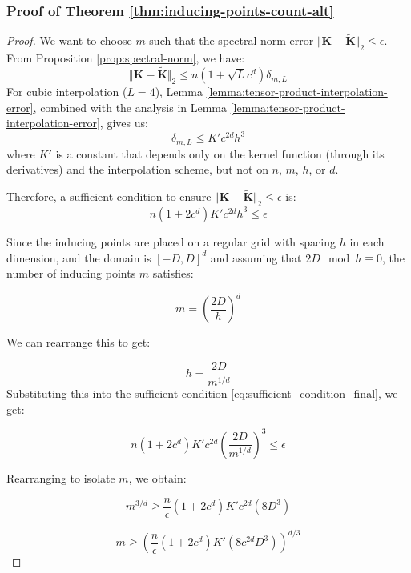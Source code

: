 \subsubsection{Proof of Theorem \ref{thm:inducing-points-count-alt}}\label{sec:proof-inducing-points-count-alt}
\inducingpointscountalt*
\begin{proof}
    We want to choose $m$ such that the spectral norm error $\Vert \textbf{K} - \tilde{\textbf{K}} \Vert_2 \leq \epsilon$. From Proposition \ref{prop:spectral-norm}, we have:
    $$
    \Vert \textbf{K} - \tilde{\textbf{K}} \Vert_2 \leq n(1 + \sqrt{L}c^d) \delta_{m,L}
    $$
    For cubic interpolation ($L=4$), Lemma \ref{lemma:tensor-product-interpolation-error}, combined with the analysis in Lemma \ref{lemma:tensor-product-interpolation-error}, gives us:
    $$
    \delta_{m,L} \leq K' c^{2d} h^3
    $$
    where $K'$ is a constant that depends only on the kernel function (through its derivatives) and the interpolation scheme, but not on $n$, $m$, $h$, or $d$.

    Therefore, a sufficient condition to ensure $\Vert \textbf{K} - \tilde{\textbf{K}} \Vert_2 \leq \epsilon$ is:
    \begin{equation} \label{eq:sufficient_condition_final}
    n(1 + 2c^d) K' c^{2d} h^3 \leq \epsilon
    \end{equation}

    Since the inducing points are placed on a regular grid with spacing $h$ in each dimension, and the domain is $[-D,D]^d$ and assuming that $2D\mod h\equiv 0$, the number of inducing points $m$ satisfies:

    $$
    m = \left(\frac{2D}{h}\right)^d
    $$

    We can rearrange this to get:

    $$
    h = \frac{2D}{m^{1/d}}
    $$
    Substituting this into the sufficient condition \eqref{eq:sufficient_condition_final}, we get:

    $$
    n (1 + 2c^d) K' c^{2d} \left(\frac{2D}{m^{1/d}}\right)^3 \leq \epsilon
    $$

    Rearranging to isolate $m$, we obtain:

    $$
    m^{3/d} \geq \frac{n}{\epsilon} (1 + 2c^d) K' c^{2d} (8D^3)
    $$

    $$
    m \geq \left( \frac{n}{\epsilon} (1 + 2c^d) K' (8 c^{2d} D^3) \right)^{d/3}
    $$
\end{proof}
